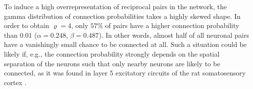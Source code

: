 




To induce a high overrepresentation of reciprocal pairs in the
network, the gamma distribution of connection probabilities takes a
highly skewed shape. In order to obtain $\varrho = 4$, only $57\%$ of
pairs have a higher connection probability than $0.01$
($\alpha=0.248$, $\beta = 0.487$). In other words, almost half of all
neuronal pairs have a vanishingly small chance to be connected at
all. Such a situation could be likely if, e.g., the connection
probability strongly depends on the spatial separation of the neurons
such that only nearby neurons are likely to be connected, as it was
found in layer 5 excitatory circuits of the rat somatosensory cortex
\cite{Perin2011}. 
